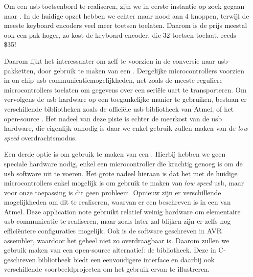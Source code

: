 \documentclass[verslag.tex]{subfiles}
\begin{document}
Om een \ac{usb} toetsenbord te realiseren, zijn we in eerste instantie op zoek gegaan naar . In de huidige opzet hebben we echter maar nood aan 4 knoppen, terwijl de meeste keyboard encoders veel meer toetsen toelaten. Daarom is de prijs meestal ook een pak hoger, zo kost de  keyboard encoder, die 32 toetsen toelaat, reeds \$35!

Daarom lijkt het interessanter om zelf te voorzien in de conversie naar \ac{usb}-pakketten, door gebruik te maken van een . Dergelijke microcontrollers voorzien in on-chip \ac{usb} communicatiemogelijkheden, net zoals de meeste reguliere microcontrollers toelaten om gegevens over een seriële \ac{uart} te transporteren. Om vervolgens de \ac{usb} hardware op een toegankelijke manier te gebruiken, bestaan er verschillende bibliotheken zoals de officiële \ac{usb} bibliotheek van Atmel, of het open-source . Het nadeel van deze piste is echter de meerkost van de \ac{usb} hardware, die eigenlijk onnodig is daar we enkel gebruik zullen maken van de \emph{low speed} overdrachtsmodus.

Een derde optie is om gebruik te maken van een . Hierbij hebben we geen speciale hardware nodig, enkel een microcontroller die krachtig genoeg is om de \ac{usb} software uit te voeren. Het grote nadeel hieraan is dat het met de huidige microcontrollers enkel mogelijk is om gebruik te maken van \emph{low speed} \ac{usb}, maar voor onze toepassing is dit geen probleem. Opnieuw zijn er verschillende mogelijkheden om dit te realiseren, waarvan er een beschreven is in een  van Atmel. Deze application note gebruikt relatief weinig hardware om elementaire \ac{usb} communicatie te realiseren, maar zoals later zal blijken zijn er zelfs nog efficiëntere configuraties mogelijk. Ook is de software geschreven in AVR assembler, waardoor het geheel niet zo overdraagbaar is. Daarom zullen we gebruik maken van een open-source alternatief: de  bibliotheek. Deze in C-geschreven bibliotheek biedt een eenvoudigere interface en daarbij ook verschillende voorbeeldprojecten om het gebruik ervan te illustreren.
\end{document}
